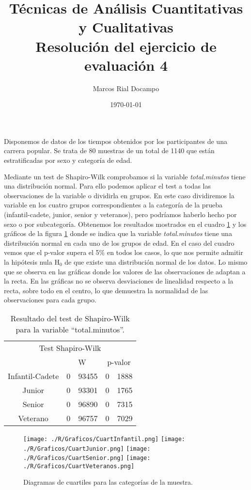 \documentclass[11pt,a4paper]{article}
\author{Marcos Rial Docampo}
\title{Técnicas de Análisis Cuantitativas y Cualitativas\\Resolución del ejercicio de evaluación 4}
\date{\small{\today}}
\begin{document}
\maketitle

Disponemos de datos de los tiempos obtenidos por los participantes de una carrera popular. Se trata de 80 muestras de un total de 1140 que están estratificadas por sexo y categoría de edad.

Mediante un test de Shapiro-Wilk comprobamos si la variable \textit{total.minutos} tiene una distribución normal. Para ello podemos aplicar el test a todas las observaciones de la variable o dividirla en grupos. En este caso dividiremos la variable en los cuatro grupos correspondientes a la categoría de la prueba (infantil-cadete, junior, senior y veteranos), pero podríamos haberlo hecho por sexo o por subcategoría. Obtenemos los resultados mostrados en el cuadro \ref{tab:Shapiro} y los gráficos de la figura \ref{fig:diagrama} donde se indica que la variable \textit{total.minutos} tiene una distribución normal en cada uno de los grupos de edad. En el caso del cuadro vemos que el p-valor supera el 5\% en todos los casos, lo que nos permite admitir la hipótesis nula H$_{0}$ de que existe una distribución normal de los datos. Lo mismo que se observa en las gráficas donde los valores de las observaciones de adaptan a la recta. En las gráficas no se observa desviaciones de linealidad respecto a la recta, sobre todo en el centro, lo que demuestra la normalidad de las observaciones para cada grupo.

\begin{table}[ht]
\centering
\begin{tabular}{cr@{,}lr@{,}l}
\toprule[0.4mm]
\multicolumn{5}{c}{Test Shapiro-Wilk}\\
 & \multicolumn{2}{c}{W} & \multicolumn{2}{c}{p-valor}\\
\midrule
Infantil-Cadete & 0&93455 & 0&1888\\
Junior & 0&93301 & 0&1765\\
Senior & 0&96890 & 0&7315\\
Veterano & 0&96757 & 0&7029\\
\bottomrule[0.4mm]
\end{tabular}
\caption{Resultado del test de Shapiro-Wilk para la variable ``total.minutos''.}
\label{tab:Shapiro}
\end{table}

\begin{figure}
\centering
\texttt{[image: ./R/Graficos/CuartInfantil.png]}
\texttt{[image: ./R/Graficos/CuartJunior.png]}
\texttt{[image: ./R/Graficos/CuartSenior.png]}
\texttt{[image: ./R/Graficos/CuartVeteranos.png]}
\caption{Diagramas de cuartiles para las categorías de la muestra.}
\label{fig:diagrama}
\end{figure}
\end{document}

